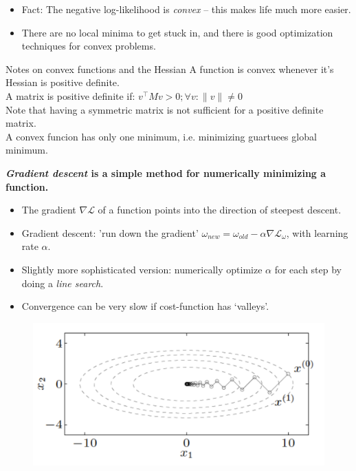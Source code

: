 \begin{itemize}
\item  Fact: The negative log-likelihood is \emph{convex} -- this makes life much more easier. 
\item  There are no local minima to get stuck in, and there is good optimization techniques for convex problems. 
\end{itemize}

\begin{bbbox}{Notes on convex functions and the Hessian}
	A function is convex whenever it's Hessian is positive definite.\\
	A matrix is positive definite if: $v^{\top} M v > 0; \forall v: \|v\| \not= 0$ \\
	Note that having a symmetric matrix is not sufficient for a positive definite matrix. \\
	A convex funcion has only one minimum, i.e. minimizing guartuees global minimum.
\end{bbbox}

\textbf{\emph{Gradient descent} is a simple method for numerically minimizing a function.}
\begin{itemize}
\item The gradient $\nabla \mathcal{L}$ of a function points into the direction of steepest descent.
\item  Gradient descent: 'run down the gradient' $\omega_{new}=\omega_{old}-\alpha \nabla \mathcal{L}_\omega$, with learning rate $\alpha$.
\item  Slightly more sophisticated version: numerically optimize $\alpha$ for each step by doing a \emph{line search}.
\item  Convergence can be very slow if cost-function has `valleys'.
\end{itemize}

\begin{figure}
\centering
\includegraphics[width=.7\textwidth]{./lecture7/BoydGradientDescent}
\end{figure}

